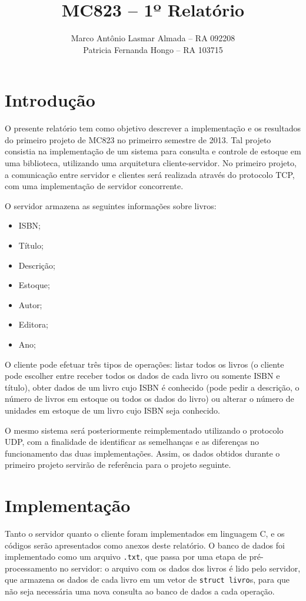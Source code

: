 \documentclass[11pt, brazil]{article} %
\title{MC823 -- 1º Relatório}
\author{Marco Antônio Lasmar Almada -- RA 092208 \\ Patricia Fernanda Hongo -- RA 103715}
\date{} %
\begin{document}
\maketitle

\section{Introdução}

O presente relatório tem como objetivo descrever a implementação e os resultados do primeiro projeto de MC823 no primeirro semestre de 2013. Tal projeto consistia na implementação de um sistema para consulta e controle de estoque em uma biblioteca, utilizando uma arquitetura cliente-servidor. No primeiro projeto, a comunicação entre servidor e clientes será realizada através do protocolo TCP, com uma implementação de servidor concorrente.

O servidor armazena as seguintes informações sobre livros:
\begin{itemize}
  \item ISBN;
  \item Título;
  \item Descrição;
  \item Estoque;
  \item Autor;
  \item Editora;
  \item Ano;  
\end{itemize}

O cliente pode efetuar três tipos de operações: listar todos os livros (o cliente pode escolher entre receber todos os dados de cada livro ou somente ISBN e título), obter dados de um livro cujo ISBN é conhecido (pode pedir a descrição, o número de livros em estoque ou todos os dados do livro) ou alterar o número de unidades em estoque de um livro cujo ISBN seja conhecido.

O mesmo sistema será posteriormente reimplementado utilizando o protocolo UDP, com a finalidade de identificar as semelhanças e as diferenças no funcionamento das duas implementações. Assim, os dados obtidos durante o primeiro projeto servirão de referência para o projeto seguinte.

\section{Implementação}

Tanto o servidor quanto o cliente foram implementados em linguagem C, e os códigos serão apresentados como anexos deste relatório.
O banco de dados foi implementado como um arquivo \texttt{.txt}, que passa por uma etapa de pré-processamento no servidor: o arquivo com os dados dos livros é lido pelo servidor, que armazena os dados de cada livro em um vetor de \texttt{struct livro}s, para que não seja necessária uma nova consulta ao banco de dados a cada operação. 
 
\end{document}
